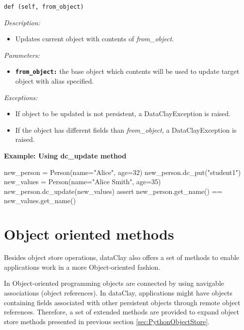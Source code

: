 
\begin{dBox}
\texttt{def  (self, from\_object)}
\LINE

{\it Description:}

\begin{itemize}
    \item Updates current object with contents of \textit{from\_object}.
\end{itemize}

{\it Parameters:}
\begin{itemize}
    \item \texttt{\bfseries from\_object:} the base object which contents will be used to update target object with alias specified.
\end{itemize}

{\it Exceptions:}

\begin{itemize}
    \item If object to be updated is not persistent, a DataClayException is raised.
    \item If the object has different fields than \textit{from\_object}, a DataClayException is raised.
\end{itemize}

\end{dBox}

\begin{tBox}
\textcolor{basecolor} {\bf Example: Using dc\_update method}
\begin{java}
new_person = Person(name="Alice", age=32)
new_person.dc_put("student1")
new_values = Person(name="Alice Smith", age=35)
new_person.dc_update(new_values)
assert new_person.get_name() == new_values.get_name()
\end{java}
\end{tBox}



\section{Object oriented methods}
\label{sec:PythonObjectExtendedMethods}

Besides object store operations, dataClay also offers a set of methods to enable applications work in a more Object-oriented fashion. 

In Object-oriented programming objects are connected by using navigable associations (object references). In dataClay, applications might have objects containing fields associated with other persistent objects through remote object references. Therefore, a set of extended methods are provided to expand object store methods presented in previous section \ref{sec:PythonObjectStore}.


